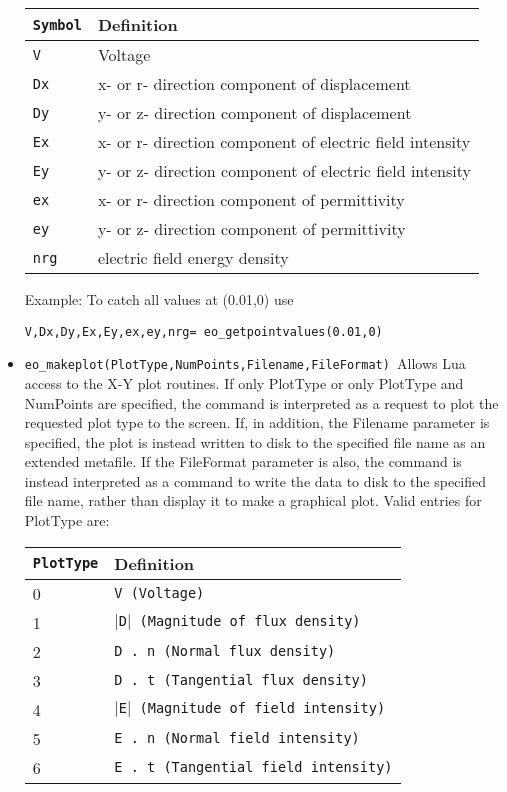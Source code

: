 \begin{itemize}
\begin{tabular}{ll}
\texttt{Symbol} &  Definition \\ \hline
\texttt{V} & Voltage \\
\texttt{Dx} & x- or r- direction component of displacement \\
\texttt{Dy} & y- or z- direction component of displacement \\
\texttt{Ex} & x- or r- direction component of electric field intensity \\
\texttt{Ey} & y- or z- direction component of electric field intensity \\
\texttt{ex} & x- or r- direction component of permittivity \\
\texttt{ey} & y- or z- direction component of permittivity \\
\texttt{nrg} & electric field energy density \\
\end{tabular}

Example: To catch all values at (0.01,0) use

\texttt{V,Dx,Dy,Ex,Ey,ex,ey,nrg= eo\_getpointvalues(0.01,0) }

\item \texttt{eo\_makeplot(PlotType,NumPoints,Filename,FileFormat) }Allows Lua access
to the X-Y plot routines. If only PlotType or only PlotType and NumPoints
are specified, the command is interpreted as a request to plot the requested
plot type to the screen. If, in addition, the Filename parameter is
specified, the plot is instead written to disk to the specified file name as
an extended metafile. If the FileFormat parameter is also, the command is
instead interpreted as a command to write the data to disk to the specified
file name, rather than display it to make a graphical plot. Valid entries
for PlotType are:

\begin{tabular}{ll}
\texttt{PlotType} &  Definition \\ \hline
 0 & \texttt{V (Voltage)} \\
 1 & \texttt{$\vert$D$\vert$ (Magnitude of flux density)} \\
 2 & \texttt{D . n (Normal flux density)} \\
 3 & \texttt{D . t (Tangential flux density)} \\
 4 & \texttt{$\vert$E$\vert$ (Magnitude of field intensity)} \\
 5 & \texttt{E . n (Normal field intensity)} \\
 6 & \texttt{E . t (Tangential field intensity)}
\end{tabular}


\end{itemize}
